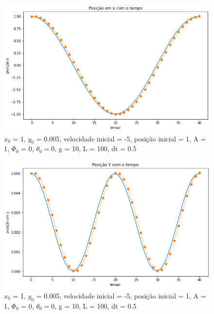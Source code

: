 \documentclass[12pt]{article}
\begin{document}
\begin{figure}[H]
  \centering
  \includegraphics[scale = 0.6]{imagens/(pendulo)dt=0.5tf=20posicaox.png}
  \caption{$x_0$ = 1, $y_0$ = 0.005, velocidade inicial = -5, posição inicial = 1, A = 1, $\Phi_0$ = 0, $\theta_0 = 0$, g = 10, L = 100, dt = 0.5}
\end{figure}
\begin{figure}[H]
  \centering
  \includegraphics[scale = 0.6]{imagens/(pendulo)dt=0.5tf=20posicaoy.png}
  \caption{$x_0$ = 1, $y_0$ = 0.005, velocidade inicial = -5, posição inicial = 1, A = 1, $\Phi_0$ = 0, $\theta_0 = 0$, g = 10, L = 100, dt = 0.5}
\end{figure}
\end{document}
